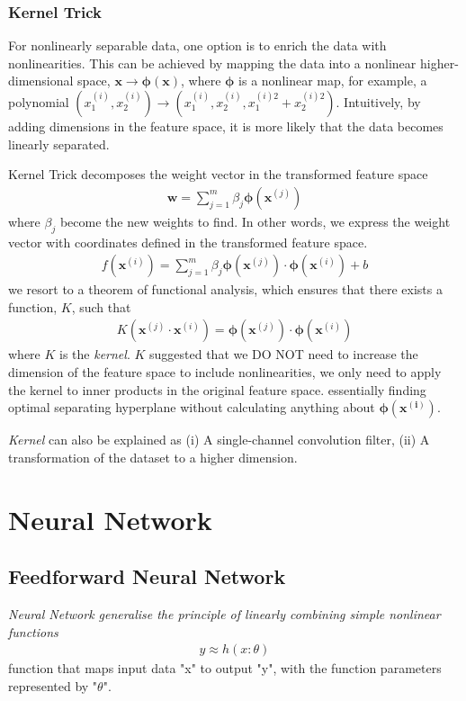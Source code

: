 \documentclass[a4paper,10pt]{article}
\begin{document}
\subsubsection{Kernel Trick}
For nonlinearly separable data, one option is to enrich the data with nonlinearities. This can be achieved by mapping the data into a nonlinear higher-dimensional space, $\mathbf{x}\rightarrow\mathbf{\phi(x)}$, where $\mathbf{\phi}$ is a nonlinear map, for example, a polynomial $(x_1^{(i)},x_2^{(i)})\rightarrow(x_1^{(i)},x_2^{(i)},x_1^{(i)2}+x_2^{(i)2})$. Intuitively, by adding dimensions in the feature space, it is more likely that the data becomes linearly separated.\par 

Kernel Trick decomposes the weight vector in the transformed feature space
\begin{gather*}
    \mathbf{w} = \sum_{j=1}^{m}\beta_j\pmb{\phi}(\pmb{x}^{(j)})
\end{gather*}
where $\beta_j$ become the new weights to find. In other words, we express the weight vector with coordinates defined in the transformed feature space.
\begin{gather*}
    f(\pmb{x}^{(i)}) = \sum_{j=1}^{m}\beta_j\pmb{\phi}(\pmb{x}^{(j)})\cdot\pmb{\phi}(\pmb{x}^{(i)})+b 
\end{gather*}
we resort to a theorem of functional analysis, which ensures that there exists a function, $K$, such that
\begin{gather*}
    K(\pmb{x}^{(j)}\cdot\pmb{x}^{(i)}) = \pmb{\phi}(\pmb{x}^{(j)})\cdot\pmb{\phi}(\pmb{x}^(i))
\end{gather*}
where $K$ is the \textit{kernel}. $K$ suggested that we DO NOT need to increase the dimension of the feature space to include nonlinearities, we only need to apply the kernel to inner products in the original feature space. essentially finding optimal separating hyperplane without calculating anything about $\pmb{\phi(x^{(i)})}$.\par 

\textit{Kernel} can also be explained as (i) A single-channel convolution filter, (ii) A transformation of the dataset to a higher dimension.




\section{Neural Network}
\subsection{Feedforward Neural Network}
\textit{Neural Network generalise the principle of linearly combining simple nonlinear functions}
\begin{gather*}
    y\approx h(x:\theta)
\end{gather*}
function that maps input data "x" to output "y", with the function parameters represented by "$\theta$".
\end{document}
